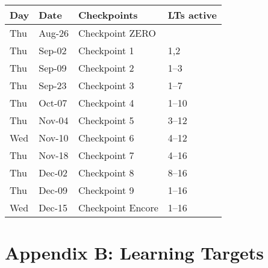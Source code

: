 \begin{longtable}[]{@{}llll@{}}
\toprule
Day & Date & Checkpoints & LTs active \\
\midrule
\endhead
Thu & Aug-26 & Checkpoint ZERO & \\
Thu & Sep-02 & Checkpoint 1 & 1,2 \\
Thu & Sep-09 & Checkpoint 2 & 1--3 \\
Thu & Sep-23 & Checkpoint 3 & 1--7 \\
Thu & Oct-07 & Checkpoint 4 & 1--10 \\
Thu & Nov-04 & Checkpoint 5 & 3--12 \\
Wed & Nov-10 & Checkpoint 6 & 4--12 \\
Thu & Nov-18 & Checkpoint 7 & 4--16 \\
Thu & Dec-02 & Checkpoint 8 & 8--16 \\
Thu & Dec-09 & Checkpoint 9 & 1--16 \\
Wed & Dec-15 & Checkpoint Encore & 1--16 \\
\bottomrule
\end{longtable}

\hypertarget{LT}{%
\section{Appendix B: Learning Targets}\label{LT}}

